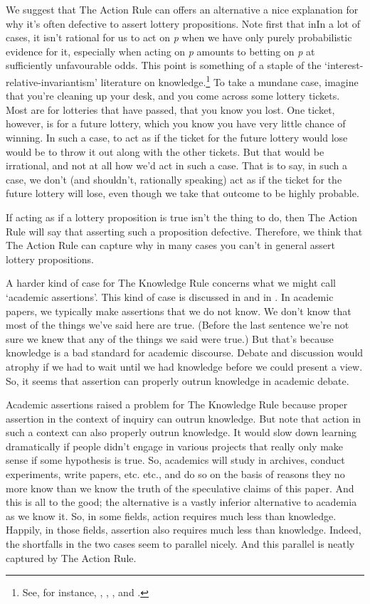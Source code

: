 We suggest that The Action Rule can offers an alternative a nice explanation for why it's often defective to assert lottery propositions. Note first that inIn a lot of cases, it isn't rational for us to act on \textit{p} when we have only purely probabilistic evidence for it, especially when acting on \textit{p} amounts to betting on \textit{p} at sufficiently unfavourable odds. This point is something of a staple of the `interest-relative-invariantism' literature on knowledge.\footnote{See, for instance, \citet{Fantl2002}, \citet{Hawthorne2004}, \citet{Stanley2005-STAKAP}, and \citet{Weatherson2005-WEACWD}.} To take a mundane case, imagine that you're cleaning up your desk, and you come across some lottery tickets. Most are for lotteries that have passed, that you know you lost. One ticket, however, is for a future lottery, which you know you have very little chance of winning. In such a case, to act as if the ticket for the future lottery would lose would be to throw it out along with the other tickets. But that would be irrational, and not at all how we'd act in such a case. That is to say, in such a case, we don't (and shouldn't, rationally speaking) act as if the ticket for the future lottery will lose, even though we take that outcome to be highly probable.

If acting as if a lottery proposition is true isn't the thing to do, then The Action Rule will say that asserting such a proposition defective. Therefore, we think that The Action Rule can capture why in many cases you can't in general assert lottery propositions.

A harder kind of case for The Knowledge Rule concerns what we might call `academic assertions'. This kind of case is discussed in \citet{Douven2006} and in \citet{MaitraANG}. In academic papers, we typically make assertions that we do not know. We don't know that most of the things we've said here are true. (Before the last sentence we're not sure we knew that any of the things we said were true.) But that's because knowledge is a bad standard for academic discourse. Debate and discussion would atrophy if we had to wait until we had knowledge before we could present a view. So, it seems that assertion can properly outrun knowledge in academic debate.

Academic assertions raised a problem for The Knowledge Rule because proper assertion in the context of inquiry can outrun knowledge. But note that action in such a context can also properly outrun knowledge. It would slow down learning dramatically if people didn't engage in various projects that really only make sense if some hypothesis is true. So, academics will study in archives, conduct experiments, write papers, etc. etc., and do so on the basis of reasons they no more know than we know the truth of the speculative claims of this paper. And this is all to the good; the alternative is a vastly inferior alternative to academia as we know it. So, in some fields, action requires much less than knowledge. Happily, in those fields, assertion also requires much less than knowledge. Indeed, the shortfalls in the two cases seem to parallel nicely. And this parallel is neatly captured by The Action Rule.


